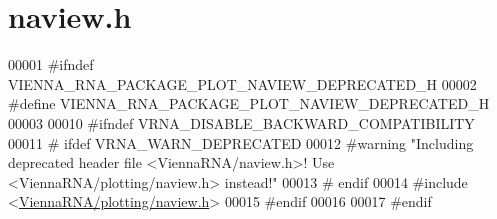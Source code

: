 \hypertarget{naview_8h_source}{}\section{naview.\+h}
\label{naview_8h_source}

\begin{DoxyCode}
00001 \textcolor{preprocessor}{#ifndef VIENNA\_RNA\_PACKAGE\_PLOT\_NAVIEW\_DEPRECATED\_H}
00002 \textcolor{preprocessor}{#define VIENNA\_RNA\_PACKAGE\_PLOT\_NAVIEW\_DEPRECATED\_H}
00003 
00010 \textcolor{preprocessor}{#ifndef VRNA\_DISABLE\_BACKWARD\_COMPATIBILITY}
00011 \textcolor{preprocessor}{# ifdef VRNA\_WARN\_DEPRECATED}
00012 \textcolor{preprocessor}{#warning "Including deprecated header file <ViennaRNA/naview.h>! Use <ViennaRNA/plotting/naview.h>
       instead!"}
00013 \textcolor{preprocessor}{# endif}
00014 \textcolor{preprocessor}{#include <\hyperlink{plotting_2naview_8h}{ViennaRNA/plotting/naview.h}>}
00015 \textcolor{preprocessor}{#endif}
00016 
00017 \textcolor{preprocessor}{#endif}
\end{DoxyCode}
